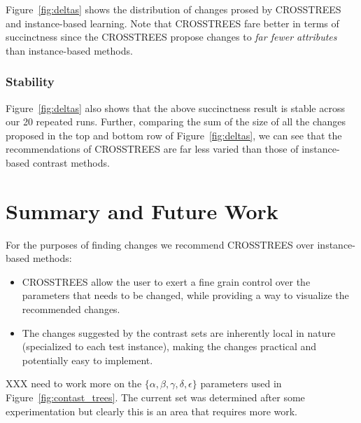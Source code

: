 \documentclass[conference]{IEEEtran}
\newcommand{\fig}[1]{Figure~\ref{fig:#1}}
\begin{document}
\fig{deltas} shows the distribution of changes prosed by CROSSTREES
and instance-based learning.  Note that CROSSTREES fare better in terms
of succinctness since the CROSSTREES propose changes to {\em far fewer attributes}
than instance-based methods.

\subsubsection{Stability}
\fig{deltas} also shows that the above succinctness result is stable across
our 20 repeated runs. Further, comparing the sum of  the size of all the changes proposed in the top and bottom row of \fig{deltas}, we can see that the recommendations of CROSSTREES are far less varied than those of instance-based contrast methods.
 
 

 \section{Summary and Future Work}
For the purposes of finding changes  we recommend
CROSSTREES over instance-based methods:
	
	\begin{itemize}
		\item CROSSTREES allow the user to exert a fine grain control over the parameters that needs to be changed, while providing a way to visualize the recommended changes.
		\item The changes suggested by the contrast sets are inherently local in nature (specialized to each test instance), making the changes practical and potentially easy to implement.
	 
	\end{itemize}

XXX need to work more on the 
	$\{\alpha, \beta, \gamma, \delta, \epsilon\}$ parameters used in
	\fig{contast_trees}. The current set was determined after some experimentation but clearly this is an area that requires more work.
	

 


\end{document}

